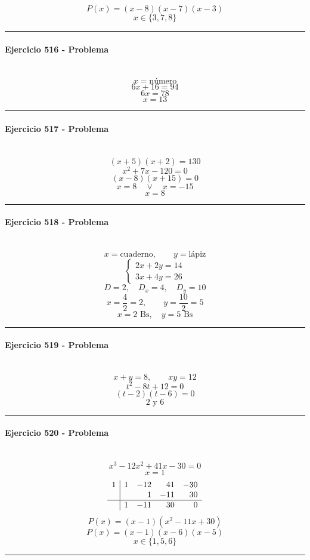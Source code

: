 \documentclass[10pt,a4paper]{article}
\newcommand{\res}[1]{\paragraph{#1}\mbox{}\\[-1.2em]}
\begin{document}
\[ P(x)=(x-8)(x-7)(x-3) \]
\[ \boxed{x\in\{3,7,8\}} \]
\vspace{1mm}\hrule\vspace{2mm}
\res{Ejercicio 516 - Problema}
\[ x=\text{número} \]
\[ 6x+16=94 \]
\[ 6x=78 \]
\[ \boxed{x=13} \]
\vspace{1mm}\hrule\vspace{2mm}
\res{Ejercicio 517 - Problema}
\[ (x+5)(x+2)=130 \]
\[ x^{2} + 7 x - 120=0 \]
\[ (x-8)(x+15)=0 \]
\[ x=8\quad \vee \quad x=-15 \]
\[ \boxed{x=8} \]
\vspace{1mm}\hrule\vspace{2mm}
\res{Ejercicio 518 - Problema}
\[ x=\text{cuaderno},\qquad y=\text{lápiz} \]
\[ \begin{cases}2x+2y=14\\3x+4y=26\end{cases} \]
\[ D=2,\quad D_x=4,\quad D_y=10 \]
\[ x=\frac{4}{2}=2,\qquad y=\frac{10}{2}=5 \]
\[ \boxed{x=2\text{ Bs},\quad y=5\text{ Bs}} \]
\vspace{1mm}\hrule\vspace{2mm}
\res{Ejercicio 519 - Problema}
\[ x+y=8,\qquad xy=12 \]
\[ t^2-8t+12=0 \]
\[ (t-2)(t-6)=0 \]
\[ \boxed{2\text{ y }6} \]
\vspace{1mm}\hrule\vspace{2mm}
\res{Ejercicio 520 - Problema}
\[ x^{3} - 12 x^{2} + 41 x - 30=0 \]
\[ x=1 \]
\[\begin{array}{r|rrrr}1 & 1 & -12 & 41 & -30\\  &  & 1 & -11 & 30\\\hline  & 1 & -11 & 30 & 0\end{array}\]
\[ P(x)=(x-1)(x^{2} - 11 x + 30) \]
\[ P(x)=(x-1)(x-6)(x-5) \]
\[ \boxed{x\in\{1,5,6\}} \]
\vspace{1mm}\hrule\vspace{2mm}
\end{document}

